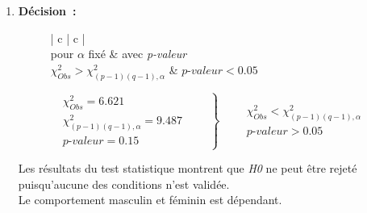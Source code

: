 \begin{enumerate}
    \item \textbf{Décision~:}
        \begin{figure}[!h]
            \centering
            \begin{minipage}{.48\linewidth}
                \begin{center}
                    \begin{tabular}{| c | c |}
                        \hline
                         \\
                        pour $\alpha$ fixé & avec \textit{p-valeur} \\ \hline
                        $\chi^{2}_{Obs} > \chi^{2}_{(p-1)(q-1), \alpha}$ & $ \textit{p-valeur} < 0.05 $\\ \hline
                    \end{tabular}
                \end{center}
            \end{minipage}\hfill\vline
            \begin{minipage}{.48\linewidth}
                \begin{equation*}
                    \left .
                    \begin{aligned}
                        \chi^{2}_{Obs} = 6.621 \\
                        \chi^{2}_{(p-1)(q-1), \alpha} = 9.487\\
                        \textit{p-valeur} = 0.15
                    \end{aligned} \qquad
                    \right\} \qquad
                    \begin{aligned} 
                        \chi^{2}_{Obs} < \chi^{2}_{(p-1)(q-1), \alpha}\\
                        \textit{p-valeur} > 0.05
                    \end{aligned}
                \end{equation*}
            \end{minipage}
        \end{figure}

        Les résultats du test statistique montrent que \textit{H0} ne peut être rejeté puisqu'aucune des conditions n'est validée. \\
        Le comportement masculin et féminin est dépendant.
\end{enumerate}

